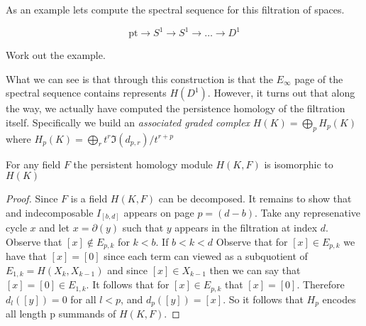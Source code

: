 As an example lets compute the spectral sequence for this filtration of spaces.
\begin{example}
\[ \textrm{pt} \rightarrow S^1 \rightarrow S^1 \rightarrow \ldots \rightarrow D^1 \] 
\end{example}
Work out the example.

What we can see is that through this construction is that the $E_\infty$ page of the spectral sequence contains represents $H(D^1)$. However, it turns out that along the way, we actually have computed the persistence homology of the filtration itself. Specifically we build an \emph{associated graded complex} $H(K) = \bigoplus_p H_p(K)$ where $H_p(K) = \bigoplus_r t^r \Im(d_{p,r}) / t^{r+p}$
\begin{theorem}
For any field $F$ the persistent homology module $H(K,F)$ is isomorphic to $H(K)$ 
\end{theorem}
\begin{proof}
Since $F$ is a field $H(K,F)$ can be decomposed. It remains to show that and indecomposable $I_{[b,d]}$ appears on page $p = (d-b)$. Take any represenative cycle $x$ and let $x = \partial(y)$ such that $y$ appears in the filtration at index $d$. Observe that $[x] \notin E_{p,k}$ for $k < b$. If $b < k < d$ Observe that for $[x] \in E_{p,k}$ we have that $[x] = [0]$ since each term can viewed as a subquotient of $E_{1,k} = H(X_k, X_{k-1})$ and since $[x] \in X_{k-1}$ then we can say that $[x] = [0] \in E_{1,k} $. It follows that for $[x] \in E_{p,k}$ that $[x] = [0]$. Therefore $d_l([y]) = 0$ for all $l < p$, and $d_p([y])=[x]$. So it follows that $H_p$ encodes all length p summands of $H(K,F)$.
\end{proof}
